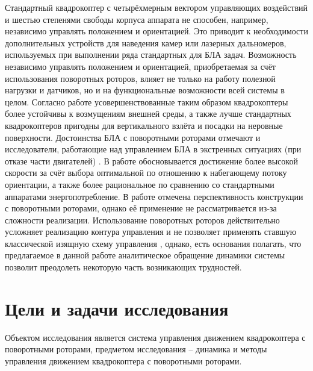 Стандартный квадрокоптер с четырёхмерным вектором управляющих воздействий и шестью степенями свободы корпуса аппарата не способен, например, независимо управлять положением и ориентацией.
Это приводит к необходимости дополнительных устройств для наведения камер или лазерных дальномеров, используемых при выполнении ряда стандартных для БЛА задач.
Возможность независимо управлять положением и ориентацией, приобретаемая за счёт использования поворотных роторов, влияет не только на работу полезной нагрузки и датчиков, но и на функциональные возможности всей системы в целом.
Согласно работе \cite{Stolc01} усовершенствованные таким образом квадрокоптеры более устойчивы к возмущениям внешней среды, а также лучше стандартных квадрокоптеров пригодны для вертикального взлёта и посадки на неровные поверхности.
Достоинства БЛА с поворотными роторами отмечают и исследователи, работающие над управлением БЛА в экстренных ситуациях (при отказе части двигателей) \cite{Morozov01, Shidar00}.
В работе \cite{Shidar00} обосновывается достижение более высокой скорости за счёт выбора оптимальной по отношению к набегающему потоку ориентации, а также более рациональное по сравнению со стандартными аппаратами энергопотребление.
В работе \cite{Morozov01} отмечена перспективность конструкции с поворотными роторами, однако её применение не рассматривается из-за сложности реализации.
Использование поворотных роторов действительно усложняет реализацию контура управления \cite{Ryll01, Falconi01, Segui01, Oosedo01} и не позволяет применять ставшую классической изящную схему управления \cite{Mellinger01}, однако, есть основания полагать, что предлагаемое в данной работе аналитическое обращение динамики системы позволит преодолеть некоторую часть возникающих трудностей.

\section{Цели и задачи исследования}

Объектом исследования является система управления движением квадрокоптера с поворотными роторами, предметом исследования -- динамика и методы управления движением квадрокоптера с поворотными роторами.

